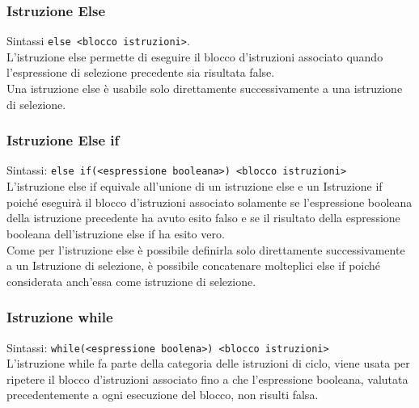 \subsubsection{Istruzione Else}
Sintassi \lstinline|else <blocco istruzioni>|. \\
L'istruzione else permette di eseguire il blocco d'istruzioni associato quando l'espressione
di selezione precedente sia risultata false. \\
Una istruzione else è usabile solo direttamente successivamente a una istruzione di selezione.

\subsubsection{Istruzione Else if}
Sintassi: \lstinline|else if(<espressione booleana>) <blocco istruzioni>| \\
L'istruzione else if equivale all'unione di un istruzione else e un Istruzione if poiché 
eseguirà il blocco d'istruzioni associato solamente se l'espressione booleana della 
istruzione precedente ha avuto esito falso e se il risultato della espressione booleana 
dell'istruzione else if ha esito vero. \\
Come per l'istruzione else è possibile definirla solo direttamente successivamente a un Istruzione 
di selezione, è possibile concatenare molteplici else if poiché considerata anch'essa come 
istruzione di selezione.

\subsubsection{Istruzione while}
Sintassi: \lstinline|while(<espressione boolena>) <blocco istruzioni>| \\
L'istruzione while fa parte della categoria delle istruzioni di ciclo, viene usata per ripetere
il blocco d'istruzioni associato fino a che l'espressione booleana, valutata precedentemente a ogni 
esecuzione del blocco, non risulti falsa.

